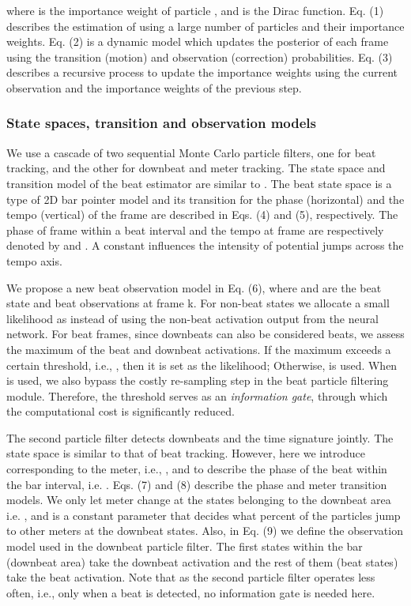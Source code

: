 \documentclass{article}
\begin{document}
where  is the importance weight of particle , and  is the Dirac function. Eq. (1) describes the estimation of  using a large number of particles  and their importance weights. Eq. (2) is a dynamic model which updates the posterior of each frame  using the transition (motion) and observation (correction) probabilities. Eq. (3) describes a recursive process to update the importance weights using the current observation and the importance weights of the previous step.         


\subsubsection{State spaces, transition and observation models}
We use a cascade of two sequential Monte Carlo particle filters, one for beat tracking, and the other for downbeat and meter tracking. The state space and transition model of the beat estimator are similar to \cite{Krebs:2}. The beat state space is a type of 2D bar pointer model and its transition for the phase (horizontal) and the tempo (vertical) of the frame are described in Eqs. (4) and (5), respectively. The phase of frame  within a beat interval and the tempo at frame  are respectively denoted by  and . A constant  influences the intensity of potential jumps across the tempo axis.

We propose a new beat observation model in Eq. (6), where  and  are the beat state and beat observations at frame k. For non-beat states we allocate a small likelihood as  instead of using the non-beat activation output from the neural network. For beat frames, since downbeats can also be considered beats, we assess the maximum of the beat and downbeat activations. If the maximum exceeds a certain threshold, i.e., , then it is set as the likelihood; Otherwise,  is used. When  is used, we also bypass the costly re-sampling step in the beat particle filtering module. Therefore, the threshold serves as an \emph{information gate}, through which the computational cost is significantly reduced. 



The second particle filter detects downbeats and the time signature jointly. The state space is similar to that of beat tracking. However, here we introduce  corresponding to the meter, i.e., , and  to describe the phase of the beat within the bar interval, i.e. . Eqs. (7) and (8) describe the phase and meter transition models. We only let meter change at the states belonging to the downbeat area i.e. , and  is a constant parameter that decides what percent of the particles jump to other meters at the downbeat states. Also, in Eq. (9) we define the observation model used in the downbeat particle filter. The first states within the bar (downbeat area) take the downbeat activation and the rest of them (beat states) take the beat activation. Note that as the second particle filter operates less often, i.e., only when a beat is detected, no information gate is needed here.
\end{document}
